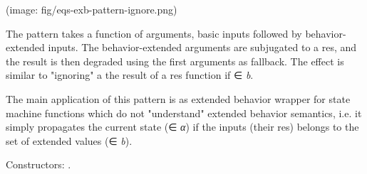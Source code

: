 \begin{haddockdesc}
(image: fig/eqs-exb-pattern-ignore.png)\par
The  pattern takes a function of  arguments, 
 basic inputs followed by  behavior-extended inputs. The 
 behavior-extended arguments are subjugated to a res, and the
 result is then degraded using the first  arguments as
 fallback. The effect is similar to "ignoring" a the result of a
 res function if ∈ \emph{b}.\par
The main application of this pattern is as extended behavior
 wrapper for state machine functions which do not "understand"
 extended behavior semantics, i.e. it simply propagates the current
 state (∈ \emph{α}) if the inputs (their res) belongs
 to the set of extended values (∈ \emph{b}).\par
Constructors: .\par

\end{haddockdesc}